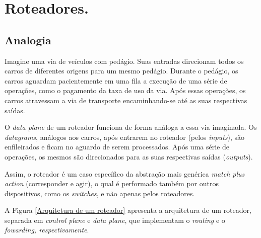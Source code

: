 





\hypertarget{Roteadores.}{%
\chapter{Roteadores.}\label{Roteadores.}}

\hypertarget{analogia}{%
\section{Analogia}\label{analogia}}

Imagine uma via de veículos com pedágio. Suas entradas direcionam todos
os carros de diferentes origens para um mesmo pedágio. Durante o
pedágio, os carros aguardam pacientemente em uma fila a execução de uma
série de operações, como o pagamento da taxa de uso da via. Após essas
operações, os carros atravessam a via de transporte encaminhando-se até
as suas respectivas saídas.

O \emph{data plane} de um roteador funciona de forma análoga a essa via
imaginada. Os \emph{datagrams}, análogos aos carros, após entrarem no
roteador (pelos \emph{inputs}), são enfileirados e ficam no aguardo de
serem processados. Após uma série de operações, os mesmos são
direcionados para as suas respectivas saídas (\emph{outputs}).

Assim, o roteador é um caso específico da abstração mais genérica
\emph{match plus action} (corresponder e agir), o qual é performado
também por outros dispositivos, como os \emph{switches}, e não apenas
pelos roteadores.

A Figura \ref{Arquitetura de um roteador} apresenta a arquitetura de um roteador, separada em
\emph{control plane} e \emph{data plane}, que implementam o
\emph{routing} e o \emph{fowarding, respectivamente}.


